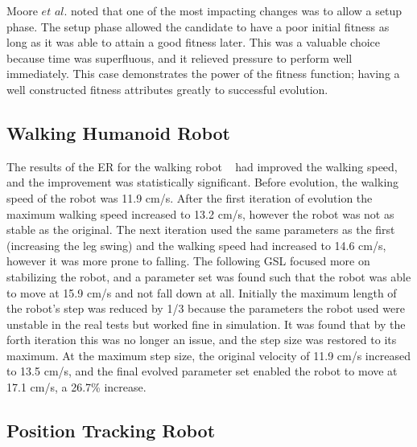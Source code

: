 \documentclass{sig-alternate}
\begin{document}
  
  Moore $et$ $al.$ noted that one of the most impacting changes was to allow a setup phase. The setup phase allowed the candidate to have a poor initial fitness as long as it was able to attain a good fitness later. This was a valuable choice because time was superfluous, and it relieved pressure to perform well immediately. This case demonstrates the power of the fitness function; having a well constructed fitness attributes greatly to successful evolution. 


  \subsection{Walking Humanoid Robot}\label{Farchy behavior}
  
	The results of the ER for the walking robot  ~\cite{Farchy:2013:HRL:2484920.2484930} had improved the walking speed, and the improvement was statistically significant. Before evolution, the walking speed of the robot was 11.9 cm/s. After the first iteration of evolution the maximum walking speed increased to 13.2 cm/s, however the robot was not as stable as the original. The next iteration used the same parameters as the first (increasing the leg swing) and the walking speed had increased to 14.6 cm/s, however it was more prone to falling. The following GSL focused more on stabilizing the robot, and a parameter set was found such that the robot was able to move at 15.9 cm/s and not fall down at all. Initially the maximum length of the robot's step was reduced by 1/3 because the parameters the robot used were unstable in the real tests but worked fine in simulation. It was found that by the forth iteration this was no longer an issue, and the step size was restored to its maximum. At the maximum step size, the original velocity of 11.9 cm/s increased to 13.5 cm/s, and the final evolved parameter set enabled the robot to move at 17.1 cm/s, a 26.7\% increase.
	
	\subsection{Position Tracking Robot}\label{Pretorius behavior}
	
\end{document}
